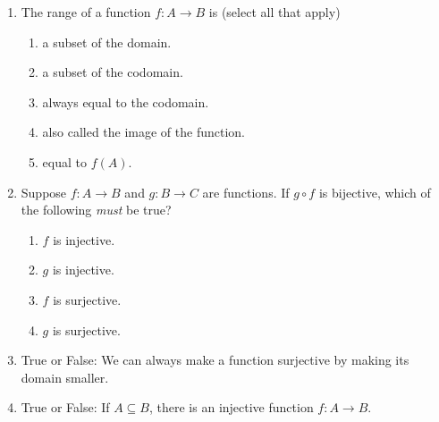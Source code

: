 \pagestyle{empty}


\begin{enumerate}
    \item The range of a function $f : A \to B$ is (select all that apply)
    \begin{enumerate}
        \item a subset of the domain.
        \item a subset of the codomain.
        \item always equal to the codomain.
        \item also called the image of the function.
        \item equal to $f(A)$.
    \end{enumerate}

    \item Suppose $f : A \to B$ and $g : B \to C$ are functions. If $g \circ f$ is bijective, which of the following \emph{must} be true?
    \begin{enumerate}
        \item $f$ is injective.
        \item $g$ is injective.
        \item $f$ is surjective.
        \item $g$ is surjective.
    \end{enumerate}
    
    \item True or False: We can always make a function surjective by making its domain smaller.
    
    \item True or False: If $A \subseteq B$, there is an injective function $f : A \to B$.
\end{enumerate}



